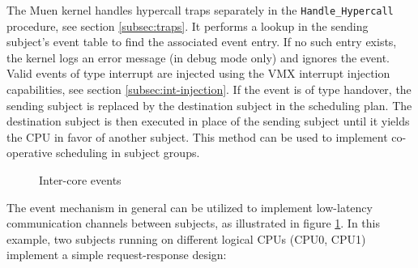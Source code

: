 The Muen kernel handles hypercall traps separately in the
\texttt{Handle\_Hypercall} procedure, see section \ref{subsec:traps}. It
performs a lookup in the sending subject's event table to find the associated
event entry. If no such entry exists, the kernel logs an error message (in
debug mode only) and ignores the event. Valid events of type interrupt are
injected using the VMX interrupt injection capabilities, see section
\ref{subsec:int-injection}. If the event is of type handover, the sending
subject is replaced by the destination subject in the scheduling plan. The
destination subject is then executed in place of the sending subject until it
yields the CPU in favor of another subject. This method can be used to implement
co-operative scheduling in subject groups.

\begin{figure}[h]
	\centering
	
	\caption{Inter-core events}
	\label{fig:inter-core-events}
\end{figure}

The event mechanism in general can be utilized to implement low-latency
communication channels between subjects, as illustrated in figure
\ref{fig:inter-core-events}. In this example, two subjects running on different
logical CPUs (CPU0, CPU1) implement a simple request-response design:

